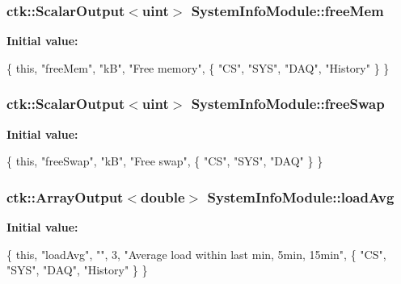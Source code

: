 \subsubsection[{\texorpdfstring{free\+Mem}{freeMem}}]{\setlength{\rightskip}{0pt plus 5cm}ctk\+::\+Scalar\+Output$<$uint$>$ System\+Info\+Module\+::free\+Mem}\hypertarget{classSystemInfoModule_a227af5d396a3643485bbf523925419c5}{}\label{classSystemInfoModule_a227af5d396a3643485bbf523925419c5}
{\bfseries Initial value\+:}
\begin{DoxyCode}
\{ \textcolor{keyword}{this}, \textcolor{stringliteral}{"freeMem"}, \textcolor{stringliteral}{"kB"}, \textcolor{stringliteral}{"Free memory"},
    \{ \textcolor{stringliteral}{"CS"}, \textcolor{stringliteral}{"SYS"}, \textcolor{stringliteral}{"DAQ"}, \textcolor{stringliteral}{"History"} \} \}
\end{DoxyCode}
\subsubsection[{\texorpdfstring{free\+Swap}{freeSwap}}]{\setlength{\rightskip}{0pt plus 5cm}ctk\+::\+Scalar\+Output$<$uint$>$ System\+Info\+Module\+::free\+Swap}\hypertarget{classSystemInfoModule_a3b0a9018339a465dd8baf002f9092afd}{}\label{classSystemInfoModule_a3b0a9018339a465dd8baf002f9092afd}
{\bfseries Initial value\+:}
\begin{DoxyCode}
\{ \textcolor{keyword}{this}, \textcolor{stringliteral}{"freeSwap"}, \textcolor{stringliteral}{"kB"}, \textcolor{stringliteral}{"Free swap"},
    \{ \textcolor{stringliteral}{"CS"}, \textcolor{stringliteral}{"SYS"}, \textcolor{stringliteral}{"DAQ"} \} \}
\end{DoxyCode}
\subsubsection[{\texorpdfstring{load\+Avg}{loadAvg}}]{\setlength{\rightskip}{0pt plus 5cm}ctk\+::\+Array\+Output$<$double$>$ System\+Info\+Module\+::load\+Avg}\hypertarget{classSystemInfoModule_a779eb35598aed3fa6a97383c6bf3d1e7}{}\label{classSystemInfoModule_a779eb35598aed3fa6a97383c6bf3d1e7}
{\bfseries Initial value\+:}
\begin{DoxyCode}
\{ \textcolor{keyword}{this}, \textcolor{stringliteral}{"loadAvg"}, \textcolor{stringliteral}{""}, 3, \textcolor{stringliteral}{"Average load within last min, 5min, 15min"},
    \{ \textcolor{stringliteral}{"CS"}, \textcolor{stringliteral}{"SYS"}, \textcolor{stringliteral}{"DAQ"}, \textcolor{stringliteral}{"History"} \} \}
\end{DoxyCode}
